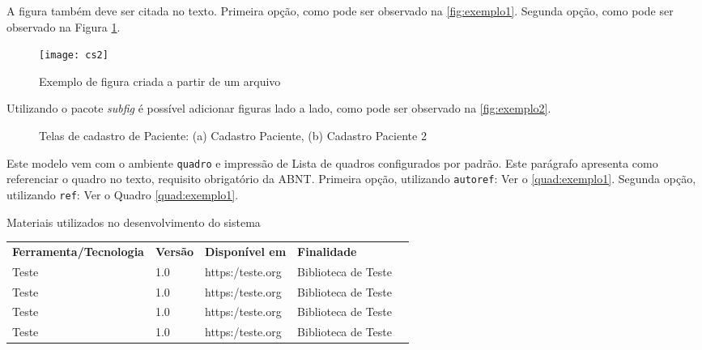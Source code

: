 A figura também deve ser citada no texto. Primeira opção, como pode ser observado na \autoref{fig:exemplo1}. Segunda opção, como pode ser observado na Figura \ref{fig:exemplo1}.

\begin{figure}[htb]
	\caption{Exemplo de figura criada a partir de um arquivo}
	\label{fig:exemplo1}
	\texttt{[image: cs2]}
\end{figure}

Utilizando o pacote \textit{subfig} é possível adicionar figuras lado a lado, como pode ser observado na \autoref{fig:exemplo2}.

\begin{figure}[htb]
	\caption{Telas de cadastro de Paciente: (a) Cadastro Paciente, (b) Cadastro Paciente 2}
	\label{fig:exemplo2}
	\centering
	\hspace{0.15cm}

	\fonte{}
\end{figure}

Este modelo vem com o ambiente \texttt{quadro} e impressão de Lista de quadros
configurados por padrão.  Este parágrafo apresenta como referenciar o quadro no texto, requisito obrigatório da ABNT. Primeira opção, utilizando \texttt{autoref}: Ver o \autoref{quad:exemplo1}. Segunda opção, utilizando  \texttt{ref}: Ver o Quadro \ref{quad:exemplo1}.

\begin{tabframed}[htb]
	\caption{Materiais utilizados no desenvolvimento do sistema}
	\label{quad:exemplo1}
	\renewcommand{\arraystretch}{1.5}
	\begin{tabular}{|l|l|l|l|l}
		\cline{1-4}
		\textbf{Ferramenta/Tecnologia} & \textbf{Versão} & \textbf{Disponível em} & \textbf{Finalidade}   \\ \cline{1-4}
		Teste                          & 1.0             & https:/teste.org       & Biblioteca de Teste & \\ \cline{1-4}
		Teste                          & 1.0             & https:/teste.org       & Biblioteca de Teste & \\ \cline{1-4}
		Teste                          & 1.0             & https:/teste.org       & Biblioteca de Teste & \\ \cline{1-4}
		Teste                          & 1.0             & https:/teste.org       & Biblioteca de Teste & \\ \cline{1-4}
	\end{tabular}
	\fonte{}
\end{tabframed}


